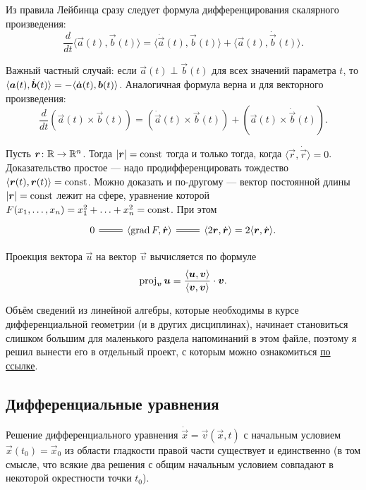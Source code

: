 Из правила Лейбинца сразу следует формула дифференцирования скалярного произведения:
\[
	\frac{d}{dt}\langle \vec{a}(t), \vec{b}(t) \rangle = \langle \dot{\vec{a}}(t), \vec{b}(t) \rangle + \langle \vec{a}(t), \dot{\vec{b}}(t) \rangle.
\]

Важный частный случай: если $\vec{a}(t) \perp \vec{b}(t)$ для всех значений параметра $t$, то $\langle\vec{a}(t), \dot{\vec{b}}(t)\rangle \hm= -\langle\dot{\vec{a}}(t), \vec{b}(t)\rangle$. Аналогичная формула верна и для векторного произведения:
\[
	\frac{d}{dt}(\vec{a}(t) \times \vec{b}(t)) = (\dot{\vec{a}}(t) \times \vec{b}(t)) + (\vec{a}(t) \times \dot{\vec{b}}(t)).
\]

Пусть $\boldsymbol{r}\colon \mathbb{R} \to \mathbb{R}^n$. Тогда $\left\lvert\boldsymbol{r}\right\rvert = \mathrm{const}$ тогда и только тогда, когда $\langle \vec{r}, \dot{\vec{r}} \rangle = 0$. Доказательство простое --- надо продифференцировать тождество $\langle \boldsymbol{r}(t), \boldsymbol{r}(t) \rangle = \mathrm{const}$. Можно доказать и по-другому --- вектор постоянной длины $\left\lvert\boldsymbol{r}\right\rvert = \mathrm{const}$ лежит на сфере, уравнение которой $F(x_1, \ldots, x_n) = x_1^2 + \ldots + x_n^2 = \mathrm{const}$. При этом
\[\begin{tikzcd}
	{0} & {\langle\grad{F}, \dot{\vec{r}}\rangle} & {\langle 2\vec{r}, \dot{\vec{r}}\rangle = 2\langle\vec{r}, \dot{\vec{r}}\rangle}.
	\arrow[equals, from=1-2, to=1-1]
	\arrow[equals, from=1-2, to=1-3]
\end{tikzcd}\]

Проекция вектора $\vec{u}$ на вектор $\vec{v}$ вычисляется по формуле
\[
	\operatorname{proj}_{\boldsymbol{v}}\boldsymbol{u} = \frac{\langle\boldsymbol{u}, \boldsymbol{v}\rangle}{\langle\boldsymbol{v}, \boldsymbol{v}\rangle} \cdot \boldsymbol{v}.
\]

Объём сведений из линейной алгебры, которые необходимы в курсе дифференциальной геометрии (и в других дисциплинах), начинает становиться слишком большим для маленького раздела напоминаний в этом файле, поэтому я решил вынести его в отдельный проект, с которым можно ознакомиться \href{https://github.com/pshenikita/Linal-Teormin}{по ссылке}.

\subsection{Дифференциальные уравнения}

\begin{theorem}
	Решение дифференциального уравнения $\dot{\vec{x}} = \vec{v}(\vec{x}, t)$ с начальным условием $\vec{x}(t_0) = \vec{x}_0$ из области гладкости правой части существует и единственно (в том смысле, что всякие два решения с общим начальным условием совпадают в некоторой окрестности точки $t_0$).
\end{theorem}

